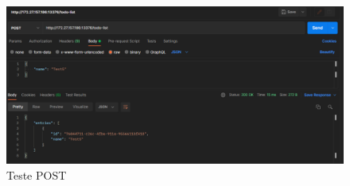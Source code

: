 \documentclass[a4paper, 12pt]{scrartcl}
\begin{document}
\begin{figure}[H]
    \begin{center}
        \includegraphics[scale=0.4]{Bilder/api_postman_test_post.png}
        \caption{Teste POST}\label{pic:api_postman_test_post}
    \end{center}
\end{figure}
\end{document}
